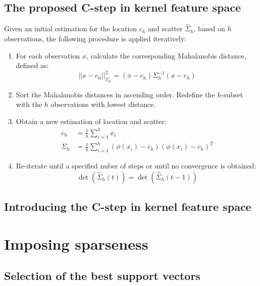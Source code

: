 \documentclass[preprint,12pt]{elsarticle}
\begin{document}
\subsection{The proposed C-step in kernel feature space}
Given an initial estimation for the location $c_h$ and scatter $\hat{\Sigma}_h$, based on $h$ observations, the following procedure is applied iteratively:
\begin{enumerate}	
	\item For each observation $x$, calculate the corresponding Mahalanobis distance, defined as:
	\begin{equation}
	||x - c_h||^2_{\Sigma_h} = (x - c_h) \Sigma^{-1}_h (x - c_h)
	\end{equation}	
	\item Sort the Mahalanobis distances in ascending order. Redefine the $h$-subset with the $h$ observations with lowest distance. 
	\item Obtain a new estimation of location and scatter:
	\begin{align}
	c_h &= \frac{1}{h} \sum_{i=1}^{h}x_i \\
	\Sigma_h &= \frac{1}{h} \sum_{i=1}^{h} (\phi(x_i) - c_h) (\phi(x_i) - c_h)^T 
	\end{align}
	
	\item Re-iterate until a specified nuber of steps or until no convergence is obtained:
	\begin{equation}
	\det(\hat{\Sigma}_h(t))=\det(\hat{\Sigma}_h(t-1))
	\end{equation}
\end{enumerate}

\subsection{Introducing the C-step in kernel feature space}

\newpage
\section{Imposing sparseness}

\subsection{Selection of the best support vectors}
\end{document}
